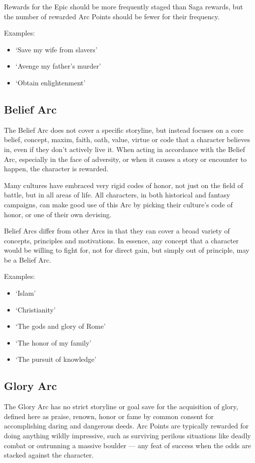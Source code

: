 \documentclass[oneside,11pt,english]{book}
\begin{document}
 
Rewards for the Epic should be more frequently staged than Saga rewards, but the number of rewarded 
Arc Points should be fewer for their frequency. 

 

Examples: 
\begin{itemize}
\item ‘Save my wife from slavers’ 
\item ‘Avenge my father’s murder’ 
\item ‘Obtain enlightenment’ 
\end{itemize}
 

\subsection{Belief Arc}
The Belief Arc does not cover a specific storyline, but instead focuses on a core belief, concept, maxim, 
faith, oath, value, virtue or code that a character believes in, even if they don’t actively live it. When 
acting in accordance with the Belief Arc, especially in the face of adversity, or when it causes a story or 
encounter to happen, the character is rewarded. 

 
Many cultures have embraced very rigid codes of honor, not just on the field of battle, but in all areas of 
life. All characters, in both historical and fantasy campaigns, can make good use of this Arc by picking 
their culture’s code of honor, or one of their own devising. 

 
Belief Arcs differ from other Arcs in that they can cover a broad variety of concepts, principles and 
motivations. In essence, any concept that a character would be willing to fight for, not for direct gain, but 
simply out of principle, may be a Belief Arc. 
 

Examples: 
\begin{itemize}
\item ‘Islam’ 
\item ‘Christianity’ 
\item ‘The gods and glory of Rome’ 
\item ‘The honor of my family’ 
\item ‘The pursuit of knowledge’ 
\end{itemize}
 

\subsection{Glory Arc} 
The Glory Arc has no strict storyline or goal save for the acquisition of glory, defined here as praise, 
renown, honor or fame by common consent for accomplishing daring and dangerous deeds. Arc Points 
are typically rewarded for doing anything wildly impressive, such as surviving perilous situations like 
deadly combat or outrunning a massive boulder — any feat of success when the odds are stacked against 
the character. 
\end{document}
